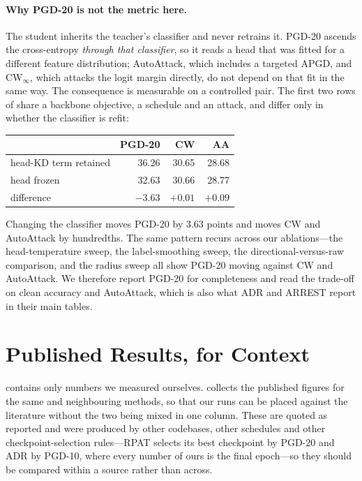 \paragraph{Why PGD-20 is not the metric here.} The student inherits the teacher's classifier and never
retrains it. PGD-20 ascends the cross-entropy \emph{through that classifier}, so it reads a head that
was fitted for a different feature distribution; AutoAttack, which includes a targeted APGD, and
CW$_\infty$, which attacks the logit margin directly, do not depend on that fit in the same way. The
consequence is measurable on a controlled pair. The first two rows of  share a
backbone objective, a schedule and an attack, and differ only in whether the classifier is refit:

\begin{center}
\begin{tabular}{lrrr}
  \toprule
  & PGD-20 & CW & AA \\
  \midrule
  head-KD term retained & 36.26 & 30.65 & 28.68 \\
  head frozen           & 32.63 & 30.66 & 28.77 \\
  \midrule
  difference            & $-3.63$ & $+0.01$ & $+0.09$ \\
  \bottomrule
\end{tabular}
\end{center}

Changing the classifier moves PGD-20 by $3.63$ points and moves CW and AutoAttack by hundredths. The
same pattern recurs across our ablations---the head-temperature sweep, the label-smoothing sweep, the
directional-versus-raw comparison, and the radius sweep all show PGD-20 moving against CW and
AutoAttack. We therefore report PGD-20 for completeness and read the trade-off on clean accuracy and
AutoAttack, which is also what ADR and ARREST report in their main tables.

\section{Published Results, for Context}
\label{app:published}

 contains only numbers we measured ourselves.  collects the
published figures for the same and neighbouring methods, so that our runs can be placed against the
literature without the two being mixed in one column. These are quoted as reported and were produced
by other codebases, other schedules and other checkpoint-selection rules---RPAT selects its best
checkpoint by PGD-20 and ADR by PGD-10, where every number of ours is the final epoch---so they should
be compared within a source rather than across.

